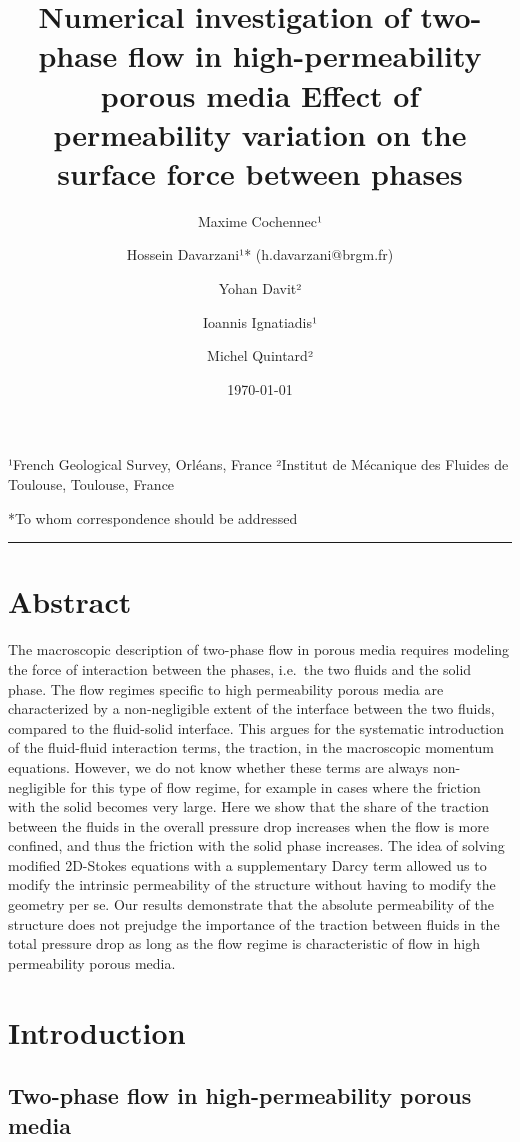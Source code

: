 \documentclass[]{article}
\title{Numerical investigation of two-phase flow in high-permeability porous
media Effect of permeability variation on the surface force between
phases}
\author{Maxime Cochennec¹ \and Hossein Davarzani¹* (h.davarzani@brgm.fr) \and Yohan Davit² \and Ioannis Ignatiadis¹ \and Michel Quintard²}
\date{\today{}}
\begin{document}
\maketitle

¹French Geological Survey, Orléans, France ²Institut de Mécanique des
Fluides de Toulouse, Toulouse, France

*To whom correspondence should be addressed

\begin{center}\rule{0.5\linewidth}{\linethickness}\end{center}

\hypertarget{abstract}{%
\section{Abstract}\label{abstract}}

The macroscopic description of two-phase flow in porous media requires
modeling the force of interaction between the phases, i.e.~the two
fluids and the solid phase. The flow regimes specific to high
permeability porous media are characterized by a non-negligible extent
of the interface between the two fluids, compared to the fluid-solid
interface. This argues for the systematic introduction of the
fluid-fluid interaction terms, the traction, in the macroscopic momentum
equations. However, we do not know whether these terms are always
non-negligible for this type of flow regime, for example in cases where
the friction with the solid becomes very large. Here we show that the
share of the traction between the fluids in the overall pressure drop
increases when the flow is more confined, and thus the friction with the
solid phase increases. The idea of solving modified 2D-Stokes equations
with a supplementary Darcy term allowed us to modify the intrinsic
permeability of the structure without having to modify the geometry per
se. Our results demonstrate that the absolute permeability of the
structure does not prejudge the importance of the traction between
fluids in the total pressure drop as long as the flow regime is
characteristic of flow in high permeability porous media.

\hypertarget{introduction}{%
\section{Introduction}\label{introduction}}

\hypertarget{two-phase-flow-in-high-permeability-porous-media}{%
\subsection{Two-phase flow in high-permeability porous
media}\label{two-phase-flow-in-high-permeability-porous-media}}
\end{document}
